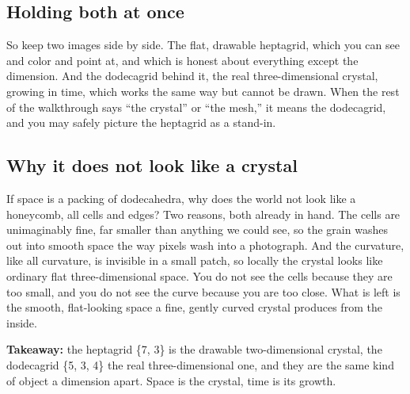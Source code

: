 \subsection{Holding both at once}

So keep two images side by side. The flat, drawable heptagrid, which you can see and color and point at, and which is honest about everything except the dimension. And the dodecagrid behind it, the real three-dimensional crystal, growing in time, which works the same way but cannot be drawn. When the rest of the walkthrough says ``the crystal'' or ``the mesh,'' it means the dodecagrid, and you may safely picture the heptagrid as a stand-in.

\subsection{Why it does not look like a crystal}

If space is a packing of dodecahedra, why does the world not look like a honeycomb, all cells and edges? Two reasons, both already in hand. The cells are unimaginably fine, far smaller than anything we could see, so the grain washes out into smooth space the way pixels wash into a photograph. And the curvature, like all curvature, is invisible in a small patch, so locally the crystal looks like ordinary flat three-dimensional space. You do not see the cells because they are too small, and you do not see the curve because you are too close. What is left is the smooth, flat-looking space a fine, gently curved crystal produces from the inside.

\textbf{Takeaway:} the heptagrid \{7, 3\} is the drawable two-dimensional crystal, the dodecagrid \{5, 3, 4\} the real three-dimensional one, and they are the same kind of object a dimension apart. Space is the crystal, time is its growth.
